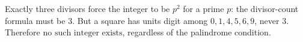 Exactly three divisors force the integer to be $p^2$ for a prime $p$: the divisor-count formula must be $3$. But a square has units digit among $0,1,4,5,6,9$, never $3$. Therefore $\boxed{\text{no such integer exists}}$, regardless of the palindrome condition.
